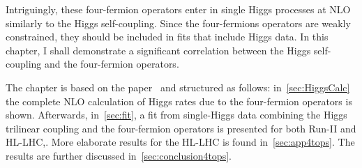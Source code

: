\par Intriguingly, these four-fermion operators enter in single Higgs processes at NLO similarly to the Higgs self-coupling. Since the four-fermions operators are weakly constrained, they should be included in fits that include Higgs data. In this chapter, I shall demonstrate a significant correlation between the Higgs self-coupling and the four-fermion operators.
\par 
The chapter is based on the paper~\cite{Alasfar:2022zyr} and structured as follows: in~\autoref{sec:HiggsCalc} the complete NLO calculation of Higgs rates due to the four-fermion operators is shown. Afterwards, in~\autoref{sec:fit}, a fit from single-Higgs data combining the Higgs trilinear coupling and the four-fermion operators is presented for both Run-II and HL-LHC,. More elaborate results for the HL-LHC is found in~\autoref{sec:app4tops}. The results are further discussed in~\autoref{sec:conclusion4tops}.
